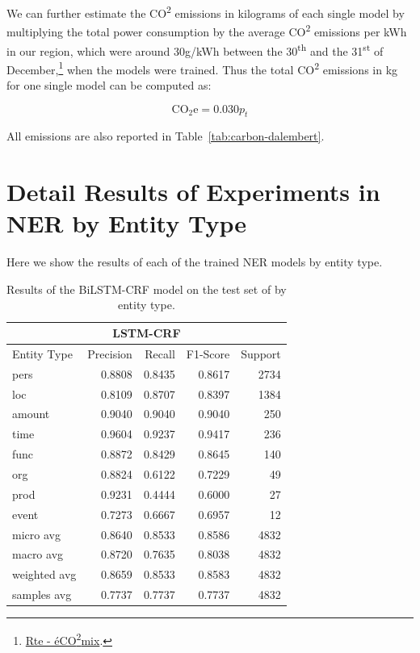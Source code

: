 We can further estimate the CO\textsuperscript{2} emissions in kilograms of each single model by multiplying the total power consumption by the average CO\textsuperscript{2} emissions per kWh in our region, which were around 30g/kWh between the 30\textsuperscript{th} and the 31\textsuperscript{st} of December,\footnote{\href{https://www.rte-france.com/eco2mix/les-emissions-de-co2-par-kwh-produit-en-france}{Rte - éCO\textsuperscript{2}mix}.} when the models were trained. Thus the total CO\textsuperscript{2} emissions in kg for one single model can be computed as:

\begin{equation*}
    \text{CO}_{2}\text{e} = 0.030 p_t
\end{equation*}

All emissions are also reported in Table~\ref{tab:carbon-dalembert}.

\section{Detail Results of Experiments in NER by Entity Type}\label{dalembert-entity-results}

Here we show the results of each of the trained NER models by entity type.

\begin{table}[ht!]
    \centering\small
    \begin{tabular}{lrrrr}
        \toprule
        \multicolumn{5}{c}{\textsc{LSTM-CRF}}                  \\
        \midrule
        Entity Type  & Precision & Recall & F1-Score & Support \\
        \midrule
        pers         & 0.8808    & 0.8435 & 0.8617   & 2734    \\
        loc          & 0.8109    & 0.8707 & 0.8397   & 1384    \\
        amount       & 0.9040    & 0.9040 & 0.9040   & 250     \\
        time         & 0.9604    & 0.9237 & 0.9417   & 236     \\
        func         & 0.8872    & 0.8429 & 0.8645   & 140     \\
        org          & 0.8824    & 0.6122 & 0.7229   & 49      \\
        prod         & 0.9231    & 0.4444 & 0.6000   & 27      \\
        event        & 0.7273    & 0.6667 & 0.6957   & 12      \\
        \midrule
        micro avg    & 0.8640    & 0.8533 & 0.8586   & 4832    \\
        macro avg    & 0.8720    & 0.7635 & 0.8038   & 4832    \\
        weighted avg & 0.8659    & 0.8533 & 0.8583   & 4832    \\
        samples avg  & 0.7737    & 0.7737 & 0.7737   & 4832    \\
        \bottomrule
    \end{tabular}
    \caption{Results of the BiLSTM-CRF model on the test set of \freemner by entity type.}
\end{table}

